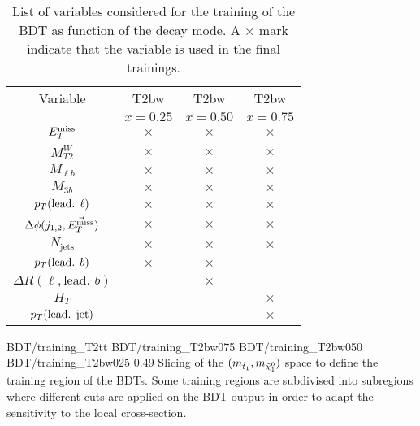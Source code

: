 \begin{table}[h!]
\begin{center}
\begin{tabular}{|c|ccc|}
                    \hline
                    Variable                            & T2bw      & T2bw      & T2bw      \\
                                                        & $x=0.25$  & $x=0.50$  & $x=0.75$  \\
                    \hline
                    $E_T^\text{miss}$                              & $\times$  & $\times$  & $\times$  \\
                    $M_{T2}^W$                          & $\times$  & $\times$  & $\times$  \\
                    $M_{\ell b}$                        & $\times$  & $\times$  & $\times$  \\
                    $M_{3 b}$                           & $\times$  & $\times$  & $\times$  \\
                    $p_T(\text{lead. } \ell)$           & $\times$  & $\times$  & $\times$  \\
                    $\Delta\phi(j_{1,2},\vec{E_T^\text{miss}})$    & $\times$  & $\times$  & $\times$  \\
                    $N_\text{jets}$                     & $\times$  & $\times$  & $\times$  \\
                    \hline
                    $p_T(\text{lead. } b)$              & $\times$  & $\times$  &           \\
                    $\Delta R( \ell, \text{lead. } b)$  &           & $\times$  &           \\
                    $H_{T}$                             &           &           & $\times$  \\
                    $p_T(\text{lead. jet})$             &           &           & $\times$  \\
                    \hline
                \end{tabular}
                \caption{List of variables considered for the training of the BDT
                as function of the decay mode. A $\times$ mark indicate that the variable
                is used in the final trainings.}
                \label{tab:BDTVariableUsage}
            \end{center}
        \end{table}

                              {BDT/training_T2tt}
                              {BDT/training_T2bw075}
                              {BDT/training_T2bw050}
                              {BDT/training_T2bw025}
                              {0.49}
                              {Slicing of the $(m_{\tilde{t}_1},m_{\tilde{\chi}_1^0})$ space
                              to define the training region of the BDTs. Some training
                              regions are subdivised into subregions where different cuts
                              are applied on the BDT output in order to adapt the sensitivity
                              to the local cross-section. }

